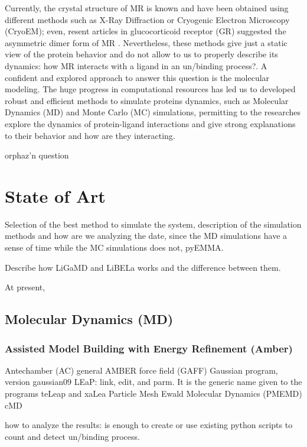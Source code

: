 \documentclass[letter,10pt, twocolumn]{article}
\begin{document}
Currently, the crystal structure of MR is known and have been obtained using different methods such as X-Ray Diffraction or Cryogenic Electron Microscopy (CryoEM); even, resent articles in glucocorticoid receptor (GR) suggested the asymmetric dimer form of MR \cite{dimer}. Nevertheless, these methods give just a static view of the protein behavior and do not allow to us to properly describe its dynamics: how MR interacts with a ligand in an un/binding process?. A confident and explored approach to answer this question is the molecular modeling. The huge progress in computational resources has led us to developed robust and efficient methods to simulate proteins dynamics, such as Molecular Dynamics (MD) and Monte Carlo (MC) simulations, permitting to the researches explore the dynamics of protein-ligand interactions and give strong explanations to their behavior and how are they interacting.  \cite{md_evidence}



orphaz'n question

\section{State of Art}

Selection of the best method to simulate the system, description of the simulation methods and how are we analyzing the date, since the MD simulations have a sense of time while the MC simulations does not, pyEMMA.

Describe how LiGaMD and LiBELa works and the difference between them.


At present,

\subsection{Molecular Dynamics (MD)}

\subsubsection*{\textbf{Assisted Model Building with Energy Refinement (Amber)}}

Antechamber (AC)
general AMBER force field (GAFF) 
Gaussian program, version gaussian09
LEaP: link, edit, and parm. It is the generic name given to the programs teLeap and xaLea
Particle Mesh Ewald Molecular Dynamics (PMEMD)
cMD

\cite{amber}

how to analyze the results: is enough to create or use existing python scripts to count and detect un/binding process.
\end{document}
